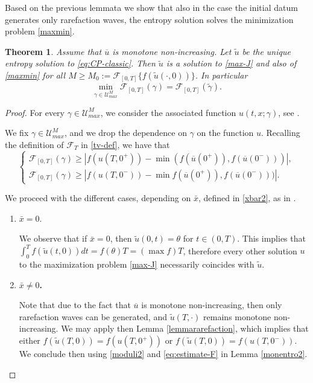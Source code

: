 \documentclass[a4paper, 10pt, final]{article}
\newtheorem{theorem}{Theorem}[section]
\begin{document}
 Based on the previous lemmata we show that  also in the case the initial datum generates only rarefaction waves, 
 the entropy solution solves the minimization problem \eqref{maxmin}. 
  \begin{theorem} 
    \label{mon2} Assume that 
  $\overline u $ is  monotone non-increasing. 
  Let $\widetilde u$ be the unique entropy solution to \eqref{eq:CP-classic}.
  Then $\widetilde u$ is a  solution to \eqref{max-J} and also of \eqref{maxmin} for all $M\geq M_0:=\mathcal F_{[0,T]} \{f(\widetilde u(\cdot, 0))\}$. In particular
    \begin{equation*}\min_{\gamma\in \mathcal{U}^M_{max}}\mathcal{F}_{[0,T]}(\gamma)
    =\mathcal{F}_{[0,T]}(\widetilde \gamma ).
    \end{equation*}
  \end{theorem}
  \begin{proof}
    For every $\gamma\in \mathcal{U}^M_{max}$, we consider the associated function $u(t,x;\gamma)$, 
    see .  
    
     We fix $\gamma\in \mathcal{U}^M_{max}$, and we drop the dependence on $\gamma$ on the function $u$. 
     Recalling the definition of $\mathcal{F}_T$ in \eqref{tv-def}, we have that
       \begin{equation}\label{moduli2}
       \begin{cases} \mathcal{F}_{[0,T]}(\gamma) \geq |f( u(T,0^+))-\min(f(\overline u(0^+)),f(\overline u(0^-)))  |,  \\ 
       \mathcal{F}_{[0,T]}(\gamma)\geq | f( u(T,0^-))-\min f(\overline u(0^+)),f(\overline u(0^-)))   |  . 
  \end{cases}\end{equation}

We proceed with the different cases, depending on   $\bar x$, defined in \eqref{xbar2}, as in . 

\begin{enumerate}
\item {\bf $\bar x=0$}. 

We observe that if $\bar x=0$, then  $\widetilde u(0, t) =\theta$ for  $t\in (0,T)$. 
This implies that $\int_0^T f(\widetilde u(t,0))dt=f(\theta)T=(\max f) T$, therefore every other solution $u$ to the maximization problem \eqref{max-J} necessarily coincides with $\widetilde u$. 


\item {\bf $\bar x\neq 0$. }

Note that due to the fact that $\overline u$ is monotone non-increasing, then only rarefaction waves can be generated, and $\widetilde u(T, \cdot)$ remains monotone non-increasing. 
We may apply then Lemma \ref{lemmararefaction}, which implies that either $f(\widetilde u(T,0))=f(u(T, 0^+))$ or  $f(\widetilde u(T,0))=f(u(T, 0^-))$. We conclude then using \eqref{moduli2} and  \eqref{eq:estimate-F} in Lemma \ref{monentro2}. 
\end{enumerate}
\end{proof}
\end{document}
